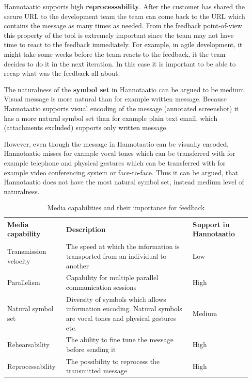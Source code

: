 \documentclass[english,12pt,a4paper,pdftex]{article}
\begin{document}
Hannotaatio supports high \textbf{reprocessability}. After the customer has shared the secure \ac{URL} to the development team the team can come back to the \ac{URL} which contains the message as many times as needed. From the feedback point-of-view this property of the tool is extremely important since the team may not have time to react to the feedback immediately. For example, in agile development, it might take some weeks before the team reacts to the feedback, it the team decides to do it in the next iteration. In this case it is important to be able to recap what was the feedback all about.

The naturalness of the \textbf{symbol set} in Hannotaatio can be argued to be medium. Visual message is more natural than for example written message. Because Hannotaatio supports visual encoding of the message (annotated screenshot) it has a more natural symbol set than for example plain text email, which (attachments excluded) supports only written message.

However, even though the message in Hannotaatio can be visually encoded, Hannotaatio misses for example vocal tones which can be transferred with for example telephone and physical gestures which can be transferred with for example video conferencing system or face-to-face. Thus it can be argued, that Hannotaatio does not have the most natural symbol set, instead medium level of naturalness.

\begin{table}[!h]
\renewcommand{\arraystretch}{1.3}
\caption{Media capabilities and their importance for feedback}
\label{table:capabilities}
\centering
\begin{tabular}{|p{4cm}|p{7cm}|p{3cm}|}
\hline
\textbf{Media \newline capability} & \textbf{Description} & \textbf{Support in Hannotaatio}\\
\hline
Transmission \newline velocity & The speed at which the information is transported from an individual to another & Low\\
\hline
Parallelism & Capability for multiple parallel communication sessions & High\\
\hline
Natural symbol set & Diversity of symbols which allows information encoding. Natural symbols are vocal tones and physical gestures etc. & Medium\\
\hline
Rehearsability & The ability to fine tune the message before sending it & High\\
\hline
Reprocessability & The possibility to reprocess the transmitted message & High\\
\hline
\end{tabular}
\end{table}
\end{document}
